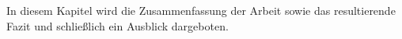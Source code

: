

In diesem Kapitel wird die Zusammenfassung der Arbeit sowie das resultierende Fazit und schlie{\ss}lich ein Ausblick dargeboten.










